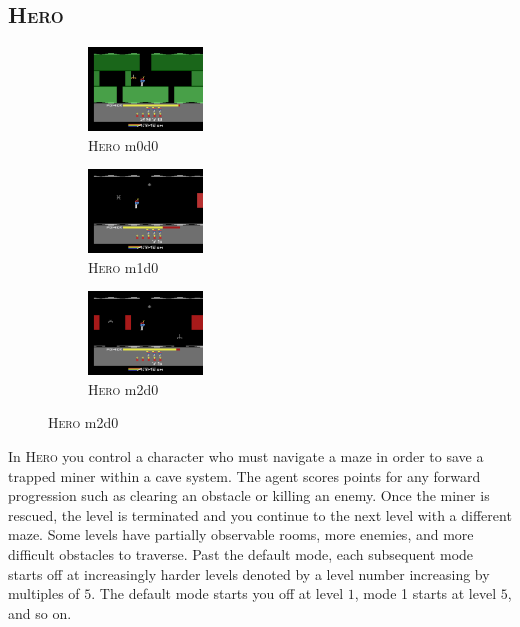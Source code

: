 \documentclass{article}
\begin{document}
\subsection*{\textsc{Hero}}
\begin{figure}[h]
    \begin{subfigure}{0.32\linewidth}
    \centering
    \includegraphics[width=1.2in]{figures/alemodes/hero_m0.png}
    \caption{\textsc{Hero} m0d0}
    \end{subfigure}
    \begin{subfigure}{0.32\linewidth}
    \centering
    \includegraphics[width=1.2in]{figures/alemodes/hero_m1.png}
    \caption{\textsc{Hero} m1d0}
    \end{subfigure}
    \begin{subfigure}{0.32\linewidth}
    \centering
    \includegraphics[width=1.2in]{figures/alemodes/hero_m2.png}
    \caption{\textsc{Hero} m2d0}
    \end{subfigure}
\end{figure}
In \textsc{Hero} you control a character who must navigate a maze in order to save a trapped miner within a cave system. 
The agent scores points for any forward progression such as clearing an obstacle or killing an enemy.
Once the miner is rescued, the level is terminated and you continue to the next level with a different maze. Some levels have partially observable rooms, more enemies, and more difficult obstacles to traverse. Past the default mode, each subsequent mode starts off at increasingly harder levels denoted by a level number increasing by multiples of $5$. The default mode starts you off at level $1$, mode 1 starts at level $5$, and so on.
\end{document}
